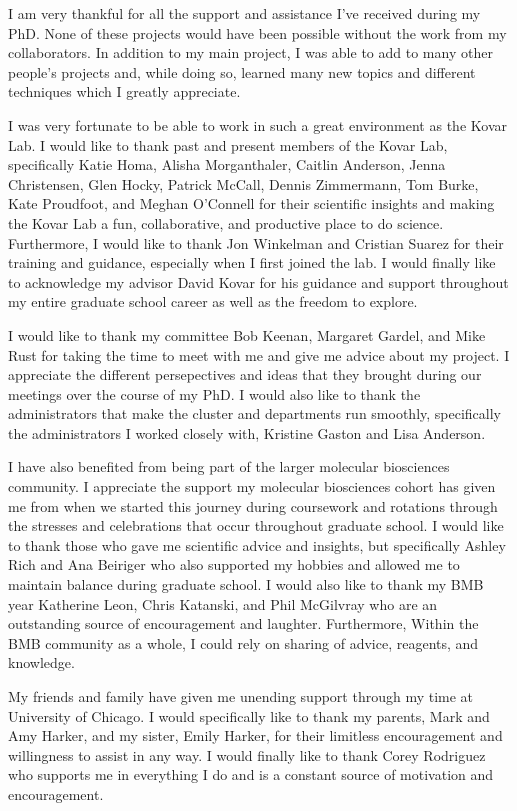\acknowledgments
I am very thankful for all the support and assistance I've received during my PhD. None of these projects would have been possible without the work from my collaborators. In addition to my main project, I was able to add to many other people's projects  and, while doing so, learned many new topics and different techniques which I greatly appreciate. 

I was very fortunate to be able to work in such a great environment as the Kovar Lab. I would like to thank past and present members of the Kovar Lab, specifically Katie Homa, Alisha Morganthaler, Caitlin Anderson, Jenna Christensen, Glen Hocky, Patrick McCall, Dennis Zimmermann, Tom Burke, Kate Proudfoot, and Meghan O'Connell for their scientific insights and making the Kovar Lab a fun, collaborative, and productive place to do science. Furthermore, I would like to thank Jon Winkelman and Cristian Suarez for their training and guidance, especially when I first joined the lab. I would finally like to acknowledge my advisor David Kovar for his guidance and support throughout my entire graduate school career as well as the freedom to explore.

I would like to thank my committee Bob Keenan, Margaret Gardel, and Mike Rust for taking the time to meet with me and give me advice about my project. I appreciate the different persepectives and ideas that they brought during our meetings over the course of my PhD. I would also like to thank the administrators that make the cluster and departments run smoothly, specifically the administrators I worked closely with, Kristine Gaston and Lisa Anderson. 

I have also benefited from being part of the larger molecular biosciences community. I appreciate the support my molecular biosciences cohort has given me from when we started this journey during coursework and rotations through the stresses and celebrations that occur throughout graduate school. I would like to thank those who gave me scientific advice and insights, but specifically Ashley Rich and Ana Beiriger who also supported my hobbies and allowed me to maintain balance during graduate school. I would also like to thank my BMB year Katherine Leon, Chris Katanski, and Phil McGilvray who are an outstanding source of encouragement and laughter. Furthermore, Within the BMB community as a whole, I could rely on sharing of advice, reagents, and knowledge.

My friends and family have given me unending support through my time at University of Chicago. I would specifically like to thank my parents, Mark and Amy Harker, and my sister, Emily Harker, for their limitless encouragement and willingness to assist in any way. I would finally like to thank Corey Rodriguez who supports me in everything I do and is a constant source of motivation and encouragement.